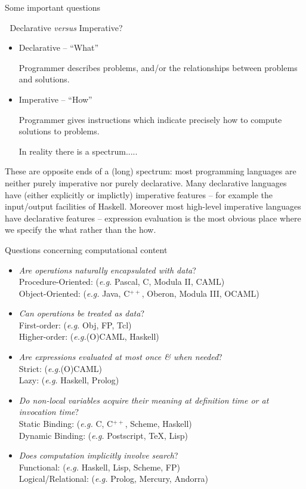 \documentclass{popl}
\begin{document}
\def\EG{{\it e.g.}\xspace}
\def\Q (#1){\item{\it #1}?}
\def\items{\\}
\begin{foil} 
\begin{cframed} 
Some important questions
\end{cframed}

Declarative {\em versus} Imperative?
\begin{itemize}
\item Declarative      -- ``What''

Programmer describes problems, 
and/or the relationships between problems 
and solutions.

\item Imperative       -- ``How'' 

Programmer gives instructions which indicate precisely how to
compute solutions to problems.


In reality there is a spectrum.....
\end{itemize} 

\begin{note} 
These are opposite ends of a (long) spectrum: most  programming
languages are neither purely imperative nor purely declarative.
Many declarative languages have (either explicitly or implictly)
imperative features -- for example the input/output facilities
of Haskell. Moreover most high-level imperative languages have
declarative features -- expression evaluation is the most
obvious place where we specify the what rather than the how.
\end{note}


\end{foil}

\begin{foil} 
Questions concerning computational content
\begin{itemize}
        \Q (Are operations naturally encapsulated with data)
        \items Procedure-Oriented: (\EG Pascal, C, Modula II, CAML)  
        \items Object-Oriented: (\EG  Java, C$^{++}$, Oberon, Modula III, OCAML)

        \Q (Can operations be treated as data)
        \items  First-order: (\EG Obj, FP, Tcl)
        \items  Higher-order: (\EG (O)CAML, Haskell)
        
        \Q (Are expressions evaluated at most once \& when needed)
        \items  Strict: (\EG (O)CAML)
        \items  Lazy: (\EG Haskell, Prolog)
        
        \Q (Do non-local variables acquire their meaning at definition time or at invocation time)
        \items  Static Binding: (\EG C, C$^{++}$, Scheme, Haskell)
        \items  Dynamic Binding: (\EG Postscript, TeX, Lisp)

        \Q (Does computation implicitly involve search)
        \items  Functional: (\EG Haskell, Lisp, Scheme, FP)
        \items  Logical/Relational: (\EG Prolog, Mercury, Andorra)
\end{itemize}

\end{foil}
\end{document}
